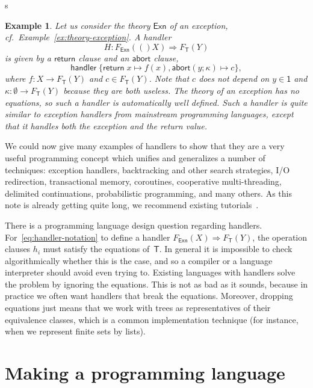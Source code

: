 s\documentclass{amsart}
\newcommand{\theory}[1]{\mathsf{#1}} %
\newcommand{\Free}[2]{F_{\theory{#1}}(#2)} %
\newcommand{\one}{\mathsf{1}} %
\newcommand{\hto}{\Rightarrow} %
\newcommand{\kode}[1]{\mathsf{#1}}
\newcommand{\handler}{\kode{handler}\;}
\newcommand{\opclause}[3]{#1(#2; #3) \mapsto}
\newcommand{\return}[1]{\kode{return}\;#1}
\newcommand{\retclause}[1]{\return{#1} \mapsto}
\newtheorem{example}[definition]{Example}
\begin{document}
\begin{example}
  Let us consider the theory $\theory{Exn}$ of an exception, cf.\
  Example~\ref{ex:theory-exception}. A handler
  \begin{equation*}
    H : \Free{Exn}(X) \hto \Free{T}{Y}
  \end{equation*}
  is given by a $\kode{return}$ clause and an $\kode{abort}$ clause,
  \begin{equation*}
    \handler \{
      \retclause{x} f(x),
      \opclause{\kode{abort}}{y}{\kappa} c
    \},
  \end{equation*}
  where $f : X \to \Free{T}{Y}$ and $c \in \Free{T}{Y}$. Note that $c$ does not
  depend on $y \in \one$ and $\kappa : \emptyset \to \Free{T}{Y}$ because they
  are both useless. The theory of an exception has no equations, so such a
  handler is automatically well defined. Such a handler is quite similar to
  exception handlers from mainstream programming languages, except that it
  handles both the exception and the return value.
\end{example}

We could now give many examples of handlers to show that they are a very useful
programming concept which unifies and generalizes a number of techniques:
exception handlers, backtracking and other search strategies, I/O redirection,
transactional memory, coroutines, cooperative multi-threading, delimited
continuations, probabilistic programming, and many others. As this note is
already getting quite long, we recommend existing
tutorials~\cite{handler-tutorials}.

There is a programming language design question regarding handlers.
For~\eqref{eq:handler-notation} to define a handler
$\Free{Exn}{X} \hto \Free{T}{Y}$, the operation clauses $h_i$ must satisfy the
equations of~$\theory{T}$. In general it is impossible to check algorithmically
whether this is the case, and so a compiler or a language interpreter should
avoid even trying to. Existing languages with handlers solve the problem by
ignoring the equations. This is not as bad as it sounds, because in practice we
often want handlers that break the equations. Moreover, dropping equations just
means that we work with trees as representatives of their equivalence classes,
which is a common implementation technique (for instance, when we represent
finite sets by lists).


\section{Making a programming language}
\label{sec:making-progr-lang}
\end{document}
